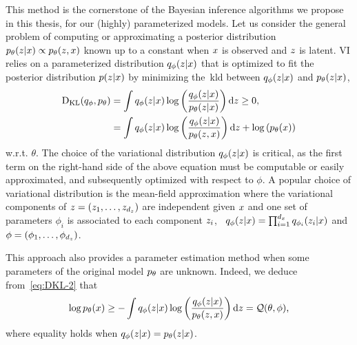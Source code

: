 This method is the cornerstone of the Bayesian inference algorithms we propose in 
this thesis, for our (highly) parameterized models. 
Let us consider the general problem of computing or approximating a posterior
distribution $p_{\theta}(z|x) \propto p_{\theta}(z,x) $ known up to a constant
when $x$ is observed and $z$ is latent. VI
relies on a parameterized
distribution $q_\phi(z|x)$ that is optimized to fit the posterior
distribution $p(z|x)$ by minimizing the~\gls*{kld}  
 between $q_\phi(z|x)$ and $p_{\theta}(z|x)$, \ie 
\begin{align}
\mathrm{D}_{\mathrm{KL}}(q_\phi,p_{\theta})& =\int q_\phi(z|x) \log \left(\frac{q_\phi(z|x)}{p_{\theta}(z|x)} \right) \mathrm{d} z \geq 0 \text{,} \nonumber  \\
\label{eq:DKL-2}
&= \int q_\phi(z|x) \log \left(\frac{q_\phi(z|x)}{p_{\theta}(z,x)} \right) \mathrm{d} z  + \log \left( p_{\theta}(x) \right)
\end{align}
w.r.t. $\theta$.
The choice of the variational distribution $q_\phi(z|x)$ is
critical, as the first term on the right-hand side of the above equation must be
computable or easily approximated, and subsequently optimized with respect to $\phi$. 
A popular choice of variational distribution is the mean-field approximation
\citep{bishop2006pattern} where the variational components of
$z=(z_1,\ldots,z_{d_z})$ are independent given $x$
and one set of parameters $\phi_i$ is associated to each component $z_i$,
\ie~$q_\phi(z|x)=\prod_{i=1}^{d_x} q_{\phi_i}(z_i|x)$ and
$\phi=(\phi_1,\ldots,\phi_{d_z})$.


This approach also provides a parameter estimation method when some parameters
of the original model $p_{\theta}$ are unknown. Indeed, 
we deduce from~\eqref{eq:DKL-2} that
\begin{equation}
\label{eq:elbo}
\log p_{\theta}(x) \geq  - \int q_\phi(z|x) \log 
\left(\frac{q_\phi(z|x)}{p_{\theta}(z,x)} \right) {\rm d}z 
= \mathcal{Q}(\theta,\phi)\text{,}
\end{equation}
where equality holds when $q_\phi(z|x)=p_{\theta}(z|x)$.




